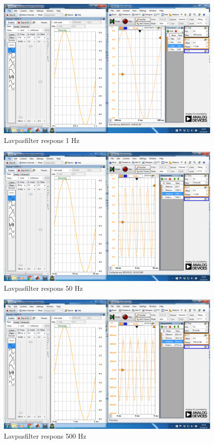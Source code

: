 \begin{figure}[H]
	\centering
	\includegraphics[width=1\textwidth]{Figurer/Lavpasfilter_Praktisk_1Hz}
	\caption{Lavpasfilter respons 1 Hz}
	\label{fig:Filter}
\end{figure}

\begin{figure}[H]
	\centering
	\includegraphics[width=1\textwidth]{Figurer/Lavpasfilter_Praktisk_50Hz}
	\caption{Lavpasfilter respons 50 Hz}
	\label{fig:Filter}
\end{figure}

\begin{figure}[H]
	\centering
	\includegraphics[width=1\textwidth]{Figurer/Lavpasfilter_Praktisk_500Hz}
	\caption{Lavpasfilter respons 500 Hz}
	\label{fig:Filter}
\end{figure}



